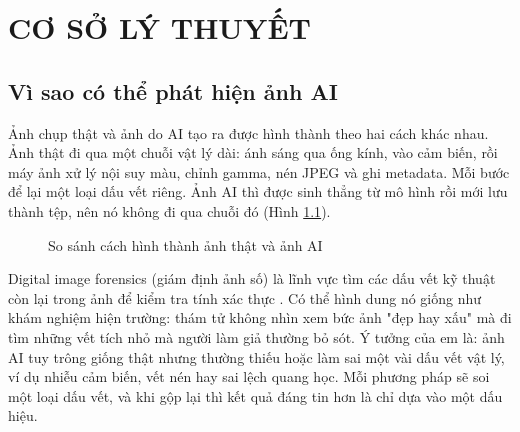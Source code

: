 \documentclass[14pt,a4paper,oneside]{report}
\begin{document}
\clearpage

\chapter{CƠ SỞ LÝ THUYẾT}

\section{Vì sao có thể phát hiện ảnh AI}
Ảnh chụp thật và ảnh do AI tạo ra được hình thành theo hai cách khác nhau. Ảnh thật đi qua một chuỗi vật lý dài: ánh sáng qua ống kính, vào cảm biến, rồi máy ảnh xử lý nội suy màu, chỉnh gamma, nén JPEG và ghi metadata. Mỗi bước để lại một loại dấu vết riêng. Ảnh AI thì được sinh thẳng từ mô hình rồi mới lưu thành tệp, nên nó không đi qua chuỗi đó (Hình \ref{fig:pipeline-compare}).

\begin{figure}[H]
\centering
{}
\caption{So sánh cách hình thành ảnh thật và ảnh AI}
\label{fig:pipeline-compare}
\end{figure}

Digital image forensics (giám định ảnh số) là lĩnh vực tìm các dấu vết kỹ thuật còn lại trong ảnh để kiểm tra tính xác thực \cite{farid,verdoliva}. Có thể hình dung nó giống như khám nghiệm hiện trường: thám tử không nhìn xem bức ảnh "đẹp hay xấu" mà đi tìm những vết tích nhỏ mà người làm giả thường bỏ sót. Ý tưởng của em là: ảnh AI tuy trông giống thật nhưng thường thiếu hoặc làm sai một vài dấu vết vật lý, ví dụ nhiễu cảm biến, vết nén hay sai lệch quang học. Mỗi phương pháp sẽ soi một loại dấu vết, và khi gộp lại thì kết quả đáng tin hơn là chỉ dựa vào một dấu hiệu.
\end{document}
